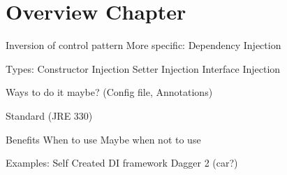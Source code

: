 \chapter{Overview Chapter}\label{ch:template-chapter}

Inversion of control pattern
More specific: Dependency Injection

Types:
Constructor Injection
Setter Injection
Interface Injection

Ways to do it maybe? (Config file, Annotations)

Standard (JRE 330)

Benefits
When to use
Maybe when not to use

Examples:
Self Created DI framework
Dagger 2 (car?)
